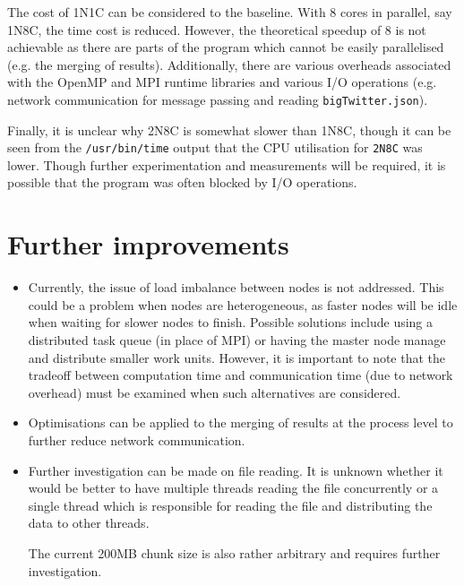 \documentclass[10pt]{article}
\begin{document}
The cost of 1N1C can be considered to the baseline. %
With 8 cores in parallel, say 1N8C, the time cost is reduced. 
However, the theoretical speedup of 8 is not achievable as there are parts of the program which cannot be easily parallelised (e.g. the merging of results). 
Additionally, there are various overheads associated with the OpenMP and MPI runtime libraries and various I/O operations (e.g. network communication for message passing and reading \texttt{bigTwitter.json}). 

Finally, it is unclear why 2N8C is somewhat slower than 1N8C, though it can be seen from the \texttt{/usr/bin/time} output that the CPU utilisation for \texttt{2N8C} was lower. 
Though further experimentation and measurements will be required, it is possible that the program was often blocked by I/O operations. 

\section{Further improvements}
\label{improvements}

\begin{itemize}
    \item
    Currently, the issue of load imbalance between nodes is not addressed. 
    This could be a problem when nodes are heterogeneous, as faster nodes will be idle when waiting for slower nodes to finish. 
    Possible solutions include using a distributed task queue (in place of MPI) or having the master node manage and distribute smaller work units. 
    However, it is important to note that the tradeoff between computation time and communication time (due to network overhead) must be examined when such alternatives are considered. 
    \item
    Optimisations can be applied to the merging of results at the process level to further reduce network communication. 
    \item
    Further investigation can be made on file reading. 
    It is unknown whether it would be better to have multiple threads reading the file concurrently or a single thread which is responsible for reading the file and distributing the data to other threads. 
    
    The current 200MB chunk size is also rather arbitrary and requires further investigation. 
\end{itemize}
\end{document}

